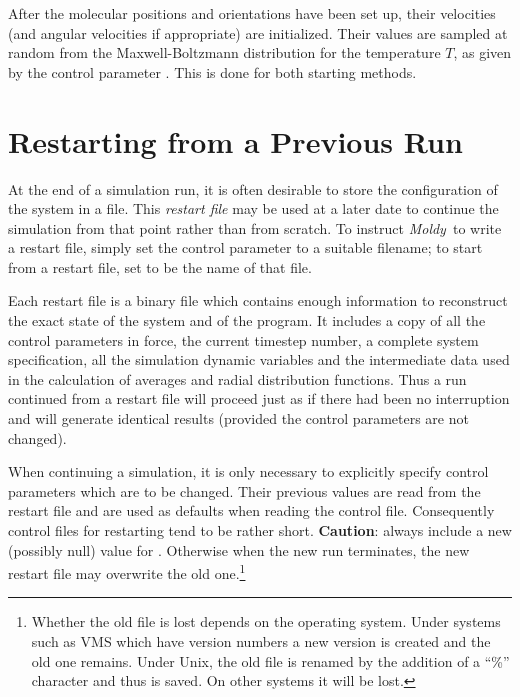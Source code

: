 \documentclass[a4paper,twoside]{report}
\newcommand{\Emph}[1]{\textbf{#1}}
\newcommand{\moldy}{\emph{Moldy}}
\begin{document}
After the molecular positions and orientations have been set up, their
velocities (and angular velocities if appropriate) are initialized.
Their values are sampled at random from the
Maxwell-Boltzmann distribution for the temperature $T$, as given by
the control parameter .  This is done for both
starting methods.

\section{Restarting from a Previous Run}%
\label{sec:restarting}

At the end of a simulation run, it is often desirable to store the
configuration of the system in a file.  This \emph{restart file} may be
used at a later date to continue the simulation from that point rather
than from scratch.  To instruct \moldy\  to write a restart file, simply
set the control parameter  to a suitable filename; to
start from a restart file, set  to be the name of
that file.

Each restart file is a binary file which contains enough information
to reconstruct the exact state of the system and of the program.  It
includes a copy of all the control parameters in force, the current
timestep number, a complete system specification, all the simulation
dynamic variables and the intermediate data used in the calculation of
averages and radial distribution functions.  Thus a run continued from
a restart file will proceed just as if there had been no interruption
and will generate identical results (provided the control parameters
are not changed).

When continuing a simulation, it is only necessary to explicitly
specify control parameters which are to be changed.  Their previous
values are read from the restart file and are used as defaults when
reading the control file. Consequently control files for restarting
tend to be rather short. \Emph{Caution}: always include a new
(possibly null) value for . Otherwise when the new run
terminates, the new restart file may overwrite the old
one.\footnote{Whether the old file is lost depends on the operating
  system. Under systems such as VMS which have version numbers a new
  version is created and the old one remains. Under Unix, the old file
  is renamed by the addition of a ``\%'' character and thus is saved.
  On other systems it will be lost.}
\end{document}
